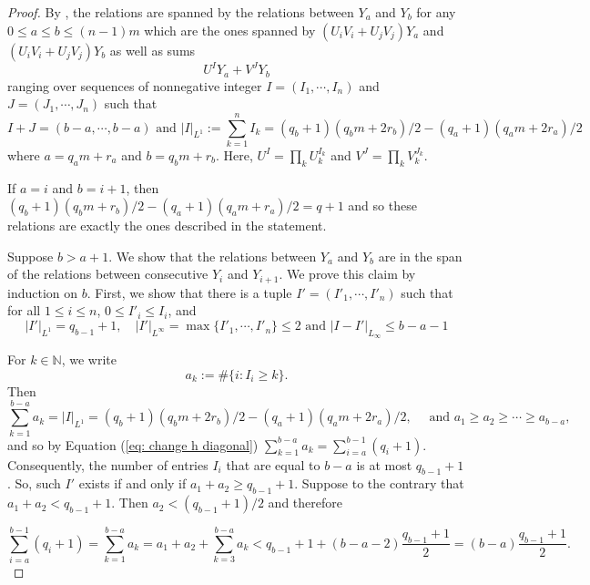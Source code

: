 \documentclass{amsart}
\newcommand{\cHFL}{\mathcal{H\!F\! L}}
\newcommand{\cc}{\mathbf{c}}
\begin{document}
\begin{proof}
By \cite[Lemma 7.1]{BLZ}, the relations are spanned by the relations between $Y_a$ and $Y_b$ for any $0\leq a\leq b \leq (n-1)m$ which are the ones spanned by $(U_iV_i+U_jV_j)Y_a$ and $(U_iV_i+U_jV_j)Y_b$ as well as sums
$$U^I Y_a+V^J Y_b$$
ranging over sequences of nonnegative integer $I=(I_1,\cdots,I_n)$ and $J=(J_1,\cdots,J_n)$ such that 
$$I+J=(b-a, \cdots, b-a) \text{ and } |I|_{L^1}:=\sum_{k=1}^n I_k=(q_b+1)(q_b m+2r_b)/2-(q_a+1)(q_a m+2r_a)/2$$
where $a=q_a m+r_a$ and $b=q_b m+r_b$. Here, $U^I=\prod_{k}U_k^{I_k}$ and $V^J=\prod_kV_k^{J_k}$.


If $a=i$ and $b=i+1$, then $(q_b+1)(q_b m+r_b)/2-(q_a+1)(q_a m+r_a)/2=q+1$ and so these relations are exactly the ones described in the statement.




Suppose $b>a+1$. We show that the relations between $Y_a$ and $Y_b$ are in the span of the relations between consecutive $Y_i$ and $Y_{i+1}$. We prove this claim by induction on $b$. First, we show that there is a tuple $I'=(I'_1,\cdots,I'_{n})$ such that for all $1\leq i\leq n$, $0\leq I'_i\leq I_i$, and
$$|I'|_{L^1}=q_{b-1}+1, \quad |I'|_{L^\infty}=\max\{I'_1,\cdots,I'_{n}\}\leq 2 \text{ and } |I-I'|_{L_{\infty}}\le b-a-1$$

For $k\in \mathbb{N}$, we write
$$a_k:=\# \{i: I_i\geq k\}.$$
Then 
$$\sum_{k=1}^{b-a} a_k=|I|_{L^1}=(q_b+1)(q_b m+2r_b)/2-(q_a+1)(q_a m+2r_a)/2, \quad \text{ and } a_1\geq a_2\geq \cdots \geq a_{b-a},$$
and so by Equation (\ref{eq: change h diagonal}) $\sum_{k=1}^{b-a}a_k=\sum_{i=a}^{b-1}(q_i+1)$. Consequently, the number of entries $I_i$ that are equal to $b-a$ is at most $q_{b-1}+1$. So, such $I'$ exists if and only if $a_1+a_2\geq q_{b-1}+1$. Suppose to the contrary that 
$a_1+a_2< q_{b-1}+1$. Then $a_2<(q_{b-1}+1)/2$ and therefore

$$\sum_{i=a}^{b-1}(q_i+1)=\sum_{k=1}^{b-a} a_k=a_1+a_2+\sum_{k=3}^{b-a}a_k< q_{b-1}+1+(b-a-2) \dfrac{q_{b-1}+1}{2}=(b-a)\frac{q_{b-1}+1}{2}.$$


\end{proof}
\end{document}
